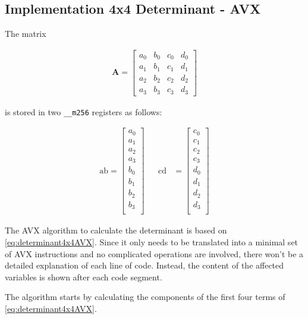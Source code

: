 \subsection{Implementation 4x4 Determinant - AVX}
\label{sec:determinant4x4AVX}

The matrix 

\begin{align*}
\mathbf{A}
=
\begin{bmatrix}
a_0&b_0&c_0&d_0\\
a_1&b_1&c_1&d_1\\
a_2&b_2&c_2&d_2\\
a_3&b_3&c_3&d_3
\end{bmatrix}
\end{align*}

is stored in two \texttt{__m256} registers as follows:

\begin{align*}
\mathrm{ab} 
=
\begin{bmatrix}
a_0\\
a_1\\
a_2\\
a_3\\
b_0\\
b_1\\
b_2\\
b_3\\
\end{bmatrix}
&&
\mathrm{cd} 
&=
\begin{bmatrix}
c_0\\
c_1\\
c_2\\
c_3\\
d_0\\
d_1\\
d_2\\
d_3\\
\end{bmatrix}
\end{align*}

The AVX algorithm to calculate the determinant is based on \cref{eq:determinant4x4AVX}.
Since it only needs to be translated into a minimal set of AVX instructions and no complicated operations are involved, there won't be a detailed explanation of each line of code.
Instead, the content of the affected variables is shown after each code segment.

The algorithm starts by calculating the components of the first four terms of \cref{eq:determinant4x4AVX}.

